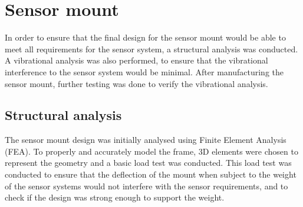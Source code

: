 \documentclass[main.tex]{subfiles}
\begin{document}
\section{Sensor mount}
In order to ensure that the final design for the sensor mount would be able to meet all requirements for the sensor system, a structural analysis was conducted. A vibrational analysis was also performed, to ensure that the vibrational interference to the sensor system would be minimal. After manufacturing the sensor mount, further testing was done to verify the vibrational analysis.

\subsection{Structural analysis}
The sensor mount design was initially analysed using Finite Element Analysis (FEA).
To properly and accurately model the frame, 3D elements were chosen to represent the geometry and a basic load test was conducted. This load test was conducted to ensure that the deflection of the mount when subject to the weight of the sensor systems would not interfere with the sensor requirements, and to check if the design was strong enough to support the weight.
\end{document}

